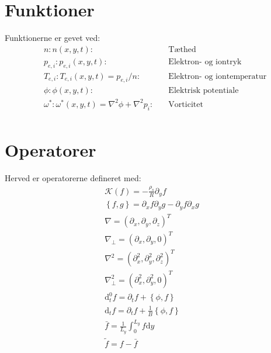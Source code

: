 \documentclass{article}
\begin{document}
\section{Funktioner}
Funktionerne er gevet ved:
\begin{align*}
    &n: n(x,y,t): &\text{Tæthed} \\
    &p_{e,i}: p_{e,i}(x,y,t): &\text{Elektron- og iontryk}  \\
    &T_{e,i}: T_{e,i}(x,y,t) = p_{e,i}/n: \quad &\text{Elektron- og iontemperatur} \\
    &\phi: \phi(x,y,t): \quad &\text{Elektrisk potentiale} \\
    &\omega^*: \omega^*(x,y,t) = \nabla^2\phi + \nabla^2 p_i: \quad &\text{Vorticitet} \\
\end{align*}


\section{Operatorer}
Herved er operatorerne defineret med:
\begin{gather*}
    \mathcal{K}(f)= - \frac{\rho_s}{R}\partial_y f \\
    \left\{ f, g\right\} = \partial_x f \partial_y g - \partial_y f \partial_x g\\
    \nabla = \left(\partial_x, \partial_y, \partial_z \right)^T\\
    \nabla_\perp = \left(\partial_x, \partial_y, 0 \right)^T\\
    \nabla^2 = \left(\partial^2_x, \partial^2_y, \partial^2_z \right)^T\\
    \nabla_\perp^2 = \left(\partial^2_x, \partial^2_y, 0 \right)^T\\
    \mathrm{d}_t^0 f = \partial_t f + \left\{\phi, f \right\}\\
    \mathrm{d}_t f = \partial_t f  + \frac{1}{B}  \left\{ \phi , f \right\} \\    
    \bar f = \frac{1}{L_y}\int_0^{L_y} f \mathrm{d}y\\
    \tilde f = f - \bar f\\
\end{gather*}
\end{document}

